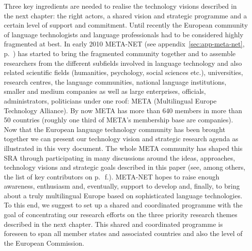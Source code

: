 \documentclass[10pt, plain]{../../metanetpaper}
\begin{document}
\begin{multicols}{2}
Three key ingredients are needed to realise the technology visions described in the next chapter: the right actors, a shared vision and strategic programme and a certain level of support and commitment. Until recently the European community of language technologists and language professionals had to be considered highly fragmented at best. In early 2010 META-NET (see appendix~\ref{sec:app-meta-net}, p.~\pageref{sec:app-meta-net}) has started to bring the fragmented community together and to assemble researchers from the different subfields involved in language technology and also related scientific fields (humanities, psychology, social sciences etc.), universities, research centres, the language communities, national language institutions, smaller and medium companies as well as large enterprises, officials, administrators, politicians under one roof: META (Multilingual Europe Technology Alliance). By now META has more than 640 members in more than 50 countries (roughly one third of META's membership base are companies). Now that the European language technology community has been brought together we can present our technology vision and strategic research agenda as illustrated in this very document. The whole META community has shaped this SRA through participating in many discussions around the ideas, approaches, technology visions and strategic goals described in this paper (see, among others, the list of key contributors on p.~\pageref{sec:list-of-contributors}\,f.). META-NET hopes to raise enough awareness, enthusiasm and, eventually, support to develop and, finally, to bring about a truly multilingual Europe based on sophisticated language technologies. To this end, we suggest to set up a shared and coordinated programme with the goal of concentrating our research efforts on the three priority research themes described in the next chapter. This shared and coordinated programme is foreseen to span all member states and associated countries and also the level of the European Commission. 
\end{multicols}

\clearpage
\end{document}
